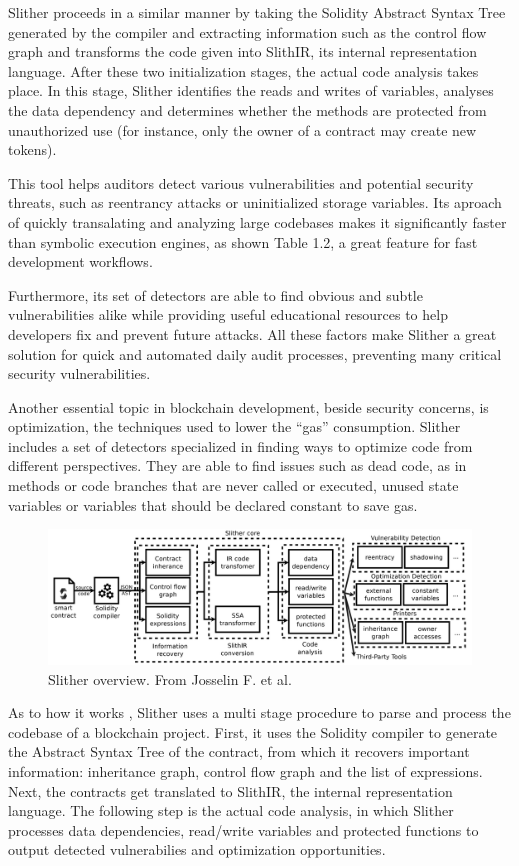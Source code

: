 Slither \cite{slither} proceeds in a similar manner by taking the Solidity Abstract Syntax Tree generated by the compiler and extracting information such as the control flow graph and transforms the code given into SlithIR, its internal representation language. After these two initialization stages, the actual code analysis takes place. In this stage, Slither identifies the reads and writes of variables, analyses the data dependency and determines whether the methods are protected from unauthorized use (for instance, only the owner of a contract may create new tokens).

This tool \cite{slither} helps auditors detect various vulnerabilities and potential security threats, such as reentrancy attacks or uninitialized storage variables. Its aproach of quickly transalating and analyzing large codebases makes it significantly faster than symbolic execution engines, as shown Table 1.2, a great feature for fast development workflows.

Furthermore, its set of detectors are able to find obvious and subtle vulnerabilities alike while providing useful educational resources to help developers fix and prevent future attacks. All these factors make Slither a great solution for quick and automated daily audit processes, preventing many critical security vulnerabilities.

Another essential topic in blockchain development, beside security concerns, is optimization, the techniques used to lower the ``gas'' consumption. Slither includes a set of detectors specialized in finding ways to optimize code \cite{slitherGitHub} from different perspectives. They are able to find issues such as dead code, as in methods or code branches that are never called or executed, unused state variables or variables that should be declared constant to save gas.

\begin{figure}[h]
    \centering
    \includegraphics[width=1\linewidth]{images/image.png}
    \caption{Slither overview. From Josselin F. et al. \cite{slither}}
    \label{fig:enter-label}
\end{figure}

As to how it works \cite{slither}, Slither uses a multi stage procedure to parse and process the codebase of a blockchain project. First, it uses the Solidity compiler to generate the Abstract Syntax Tree of the contract, from which it recovers important information: inheritance graph, control flow graph and the list of expressions. Next, the contracts get translated to SlithIR, the internal representation language. The following step is the actual code analysis, in which Slither processes data dependencies, read/write variables and protected functions to output detected vulnerabilies and optimization opportunities. 
